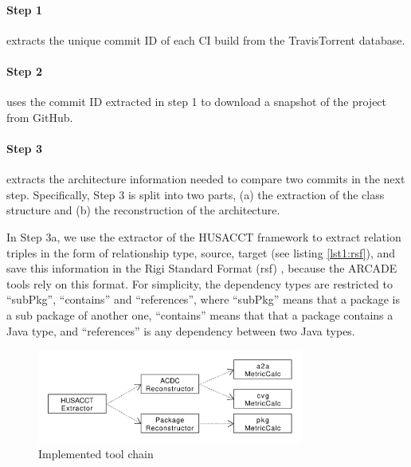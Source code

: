 \documentclass[sigplan, anonymous, review]{acmart}
\newcommand{\sn}[1]{{\color{blue}\textbf{Sarah:}~#1}}
\newcommand{\jk}[1]{{\color{violet}\textbf{Johannes:}~#1}}
\begin{document}
\paragraph{Step 1} extracts the unique commit ID of each CI build from the TravisTorrent database.

\paragraph{Step 2} uses the commit ID extracted in step 1 to download a snapshot of the project from GitHub.


\paragraph{Step 3} extracts the architecture information needed to compare two commits in the next step. 
Specifically, Step 3 is split into two parts, (a) the extraction of the class structure and (b) the reconstruction of the architecture. 

In Step 3a, we use the extractor of the HUSACCT framework \cite{Husacct1} to extract relation triples in the form of relationship type, source, target (see listing \ref{lst1:rsf}), and save this information in the Rigi Standard Format (rsf) \cite{RSF}, because the ARCADE tools rely on this format. 
For simplicity, the dependency types are restricted to ``subPkg'', ``contains'' and ``references'', where ``subPkg'' means that a package is a sub package of another one, ``contains'' means that that a package contains a Java type, and ``references'' is any dependency between two Java types.

\begin{figure}[!t]
	\centering
	\includegraphics[width=3.45in]{assets/implementedArc.pdf}
	\caption{Implemented tool chain}
	\label{implToolchain}
\end{figure}
\end{document}
